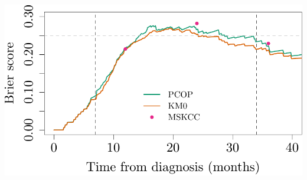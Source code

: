 \documentclass{article}\usepackage[]{graphicx}\usepackage[]{color}
\makeatletter
\def\maxwidth{ %
  \ifdim\Gin@nat@width>\linewidth
    \linewidth
  \else
    \Gin@nat@width
  \fi
}
\newenvironment{knitrout}{}{} %
\makeatother
\begin{document}
\begin{knitrout}
{\centering \includegraphics[width=\maxwidth]{figure/07-prob-bs-paths-plot-dresden-1} 

}



\end{knitrout}
\end{document}

